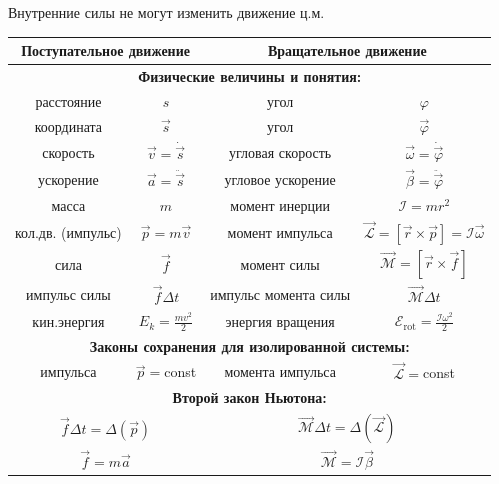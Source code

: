 \documentclass[12pt,epsfig,color,russian]{article}
\begin{document}
Внутренние силы не могут изменить движение ц.м.
\newpage
\noindent
\begin{tabular}{|cc||cc|} \hline
\multicolumn{2}{|c||}{\rule[-5mm]{0mm}{13mm}\bf Поступательное движение} &
\multicolumn{2}{c|}{\bf Вращательное движение}\\ \hline\hline
\multicolumn{4}{|c|}{\color{blue}\bf Физические величины и понятия:\rule[-5mm]{0mm}{15mm}}\\ \hline
расстояние \rule[-5mm]{0mm}{13mm}& $s$ & угол & $\varphi$\\ \hline
координата \rule[-5mm]{0mm}{13mm}& $\vec{s}$ & угол & $\vec{\varphi}$\\ \hline
скорость \rule[-5mm]{0mm}{13mm}& $\vec{v}=\dot{\vec{s}}$ & угловая скорость & $\vec{\omega}=\dot{\vec{\varphi}}$\\ \hline
ускорение \rule[-5mm]{0mm}{13mm}& $\vec{a}=\ddot{\vec{s}}$ & угловое ускорение & $\vec{\beta}=\ddot{\vec{\varphi}}$\\ \hline
масса \rule[-5mm]{0mm}{13mm}& $m$ & момент инерции & $\mathcal{I}=mr^2$\\ \hline
кол.дв. (импульс)\rule[-5mm]{0mm}{13mm}&$\vec{p}=m\vec{v}$ & момент импульса & $\vec{\mathcal{L}}=\left[\vec{r}\times\vec{p}\right]=\mathcal{I}\vec{\omega}$ \\ \hline
сила \rule[-5mm]{0mm}{13mm}&$\vec{f}$ & момент силы & $\vec{\mathcal{M}}=\left[\vec{r}\times\vec{f}\right]$ \\ \hline
импульс силы \rule[-5mm]{0mm}{13mm}&$\vec{f}\Delta t$ & импульс момента силы & $\vec{\mathcal{M}}\Delta t$ \\ \hline
кин.энергия \rule[-5mm]{0mm}{13mm}&$E_k=\frac{mv^2}2$ & энергия вращения &
$\mathcal{E}_{\mathrm{rot}}=\frac{\mathcal{I}\omega^2}2$ \\ \hline\hline
\multicolumn{4}{|c|}{\color{blue}\bf Законы сохранения для изолированной системы:\rule[-5mm]{0mm}{15mm}}\\ \hline
импульса\rule[-5mm]{0mm}{13mm}&$\vec{p}=$const&
момента импульса&$\vec{\mathcal{L}}=$const\\ \hline\hline
\multicolumn{4}{|c|}{\color{blue}\bf Второй закон Ньютона:\rule[-5mm]{0mm}{15mm}}\\ \hline
\multicolumn{2}{|c||}{\rule[-5mm]{0mm}{13mm}$\vec{f}\Delta t = \Delta(\vec{p})$}&
\multicolumn{2}{c|}{$\vec{\mathcal{M}}\Delta t = \Delta(\vec{\mathcal{L}})$}\\ \hline
\multicolumn{2}{|c||}{\rule[-5mm]{0mm}{13mm}$\vec{f} = m\vec{a}$}&
\multicolumn{2}{c|}{$\vec{\mathcal{M}} = \mathcal{I}\vec{\beta}$}\\ \hline
\end{tabular}
\end{document}
